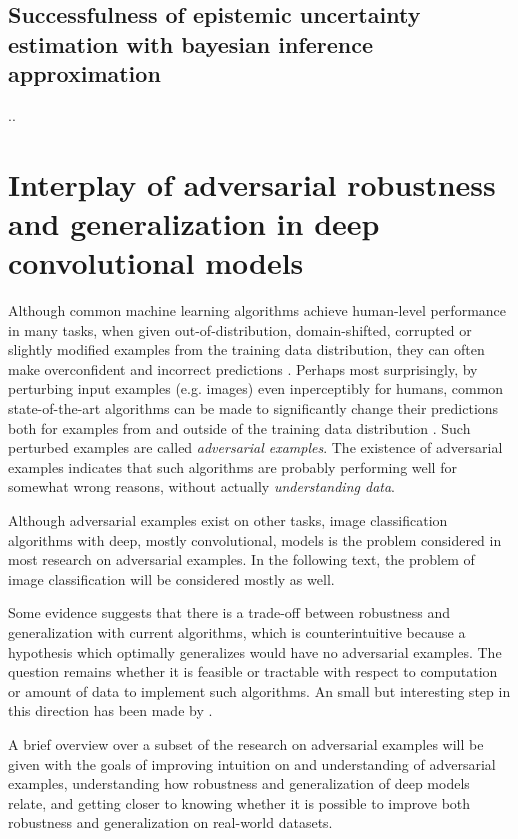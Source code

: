 \documentclass[twocolumn]{article}
\begin{document}
\subsection{Successfulness of epistemic uncertainty estimation with bayesian inference approximation}



\newpage.\newpage.\newpage
\newpage
\section{Interplay of adversarial robustness and generalization in deep convolutional models}

Although common machine learning algorithms achieve human-level performance in many tasks, when given out-of-distribution, domain-shifted, corrupted or slightly modified examples from the training data distribution, they can often make overconfident and incorrect predictions \citep{Hendrycks:2016:BDMOODE,Ganin:2015:UDAB,Nguyen:2015:DNNEFHCPUI,Hendrycks:2019:BNNRCCP,Engstrom:2017:RTSFCST,Szegedy:2013:IPNN}. Perhaps most surprisingly, by perturbing input examples (e.g. images) even inperceptibly for humans, common state-of-the-art algorithms can be made to significantly change their predictions both for examples from and outside of the training data distribution \citep{Szegedy:2013:IPNN, Goodfellow:2014:EHAE}. Such perturbed examples are called \textit{adversarial examples}. The existence of adversarial examples indicates that such algorithms are probably performing well for somewhat wrong reasons, without actually \textit{understanding data}.

Although adversarial examples exist on other tasks, image classification algorithms with deep, mostly convolutional, models is the problem considered in most research on adversarial examples. In the following text, the problem of image classification will be considered mostly as well.

Some evidence suggests that there is a trade-off between robustness and generalization \citep{Tsipras:2018:RMBOA,Madry:2017:TDLMRAA,Su:2018:IRTCOACSRDICM} with current algorithms, which is counterintuitive because a hypothesis which optimally generalizes would have no adversarial examples. The question remains whether it is feasible or tractable with respect to computation or amount of data to implement such algorithms. An small but interesting step in this direction has been made by \citep{Stutz:2018:DARG}.

A brief overview over a subset of the research on adversarial examples will be given with the goals of improving intuition on and understanding of adversarial examples, understanding how robustness and generalization of deep models relate, and getting closer to knowing whether it is possible to improve both robustness and generalization on real-world datasets. 
\end{document}
